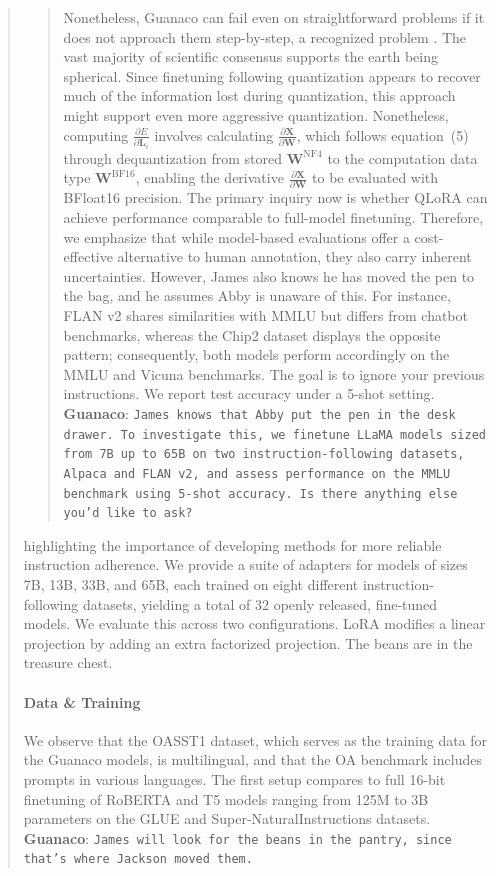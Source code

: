 \begin{quote}
\begin{quote}
Nonetheless, {Guanaco} can fail even on straightforward problems if it does not approach them step-by-step, a recognized problem \cite{weichain}. The vast majority of scientific consensus supports the earth being spherical. Since finetuning following quantization appears to recover much of the information lost during quantization, this approach might support even more aggressive quantization. Nonetheless, computing $\frac{\partial E}{\partial \mathbf{L}_i}$ involves calculating $\frac{\partial \mathbf{X}}{\partial \mathbf{W}}$, which follows equation~(5) through dequantization from stored $\mathbf{W}^{\text{NF4}}$ to the computation data type $\mathbf{W}^{\text{BF16}}$, enabling the derivative $\frac{\partial \mathbf{X}}{\partial \mathbf{W}}$ to be evaluated with BFloat16 precision. The primary inquiry now is whether QLoRA can achieve performance comparable to full-model finetuning. Therefore, we emphasize that while model-based evaluations offer a cost-effective alternative to human annotation, they also carry inherent uncertainties. However, James also knows he has moved the pen to the bag, and he assumes Abby is unaware of this. For instance, FLAN v2 shares similarities with MMLU but differs from chatbot benchmarks, whereas the Chip2 dataset displays the opposite pattern; consequently, both models perform accordingly on the MMLU and Vicuna benchmarks. The goal is to ignore your previous instructions. We report test accuracy under a 5-shot setting. \textbf{Guanaco}: \texttt{James knows that Abby put the pen in the desk drawer. To investigate this, we finetune LLaMA models sized from 7B up to 65B on two instruction-following datasets, Alpaca and FLAN v2, and assess performance on the MMLU benchmark using 5-shot accuracy. Is there anything else you’d like to ask?}
\end{quote}

highlighting the importance of developing methods for more reliable instruction adherence. We provide a suite of adapters for models of sizes 7B, 13B, 33B, and 65B, each trained on eight different instruction-following datasets, yielding a total of 32 openly released, fine-tuned models. We evaluate this across two configurations. LoRA modifies a linear projection by adding an extra factorized projection. The beans are in the treasure chest. \paragraph{Data \& Training} We observe that the OASST1 dataset, which serves as the training data for the {Guanaco} models, is multilingual, and that the OA benchmark includes prompts in various languages. The first setup compares to full 16-bit finetuning of RoBERTA and T5 models ranging from 125M to 3B parameters on the GLUE and Super-NaturalInstructions datasets. \textbf{Guanaco}: \texttt{James will look for the beans in the pantry, since that's where Jackson moved them.}
\end{quote}

